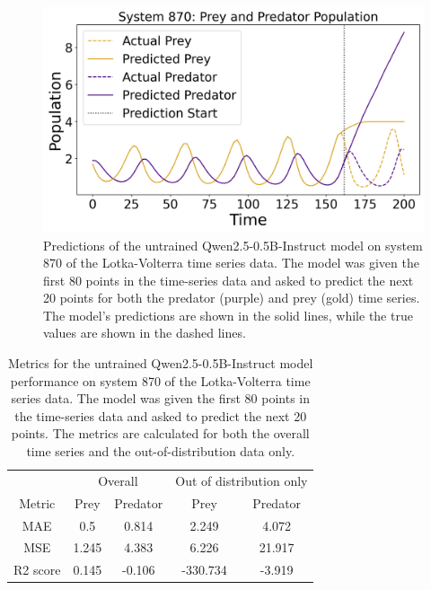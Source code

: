 \documentclass[11pt,a4paper]{article}
\begin{document}
\begin{figure}[h]
    \centering
    \includegraphics[width=\columnwidth, keepaspectratio]{../plots/predictions_example.png}
    \caption{Predictions of the untrained Qwen2.5-0.5B-Instruct model on system 870 of the Lotka-Volterra time series data. The model was given the first 80 points in the time-series data and asked to predict the next 20 points for both the predator (purple) and prey (gold) time series. The model's predictions are shown in the solid lines, while the true values are shown in the dashed lines.}
    \label{fig:baseline_pred}
\end{figure}

\begin{table}
    \centering
    \begin{tabular}{c|c|c|c|c}
        & \multicolumn{2}{c|}{Overall} & \multicolumn{2}{|c}{Out of distribution only}\\
        Metric & Prey & Predator & Prey & Predator \\
        \hline
        MAE & 0.5 & 0.814 & 2.249& 4.072\\
        MSE & 1.245 & 4.383 & 6.226& 21.917\\
        R2 score & 0.145 & -0.106 & -330.734& -3.919\\
    \end{tabular}
    \caption{Metrics for the untrained Qwen2.5-0.5B-Instruct model performance on system 870 of the Lotka-Volterra time series data. The model was given the first 80 points in the time-series data and asked to predict the next 20 points. The metrics are calculated for both the overall time series and the out-of-distribution data only.}
    \label{tab:baseline}
\end{table}
\end{document}
